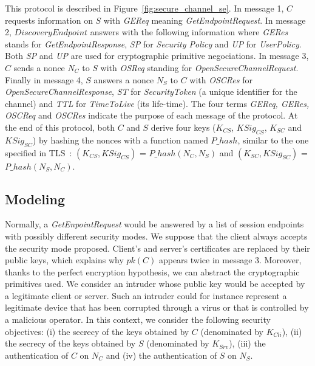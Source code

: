 This protocol is described in Figure~\ref{fig:secure_channel_se}.  In
message 1, $C$ requests information on $S$ with {\em GEReq} meaning
{\em GetEndpointRequest}.  In message 2, $DiscoveryEndpoint$ answers
with the following  information where {\em GERes} stands for {\em
  GetEndpointResponse}, {\em SP} for {\em Security Policy} and {\em
  UP} for {\em UserPolicy}.  Both {\em SP} and {\em UP} are used for
cryptographic primitive negociations.  In message 3, $C$ sends a nonce
 $N_{C}$ to $S$ with {\em OSReq} standing for {\em
  OpenSecureChannelRequest}.  Finally in message 4, $S$ answers a
nonce $N_{S}$ to $C$ with {\em OSCRes} for {\em
  OpenSecureChannelResponse}, {\em ST} for {\em SecurityToken} (a
unique identifier for the channel) and {\em TTL} for {\em TimeToLive}
(its life-time).  The four terms {\em GEReq, GERes, OSCReq} and {\em
  OSCRes} indicate the purpose of each message of the protocol.  At
  the end of this protocol, both $C$ and $S$ derive four keys ($K_{CS}$,
  $KSig_{CS}$, $K_{SC}$ and $KSig_{SC}$) by hashing the
nonces with a function named $P\_hash$, similar to the one specified
in TLS~\cite{DR08}: $(K_{CS}, KSig_{CS})$ = $P\_hash(N_{C}, N_{S})$
and $(K_{SC}, KSig_{SC})$ = $P\_hash(N_{S}, N_{C})$.

\subsection{Modeling}\label{sec:secure_channel_modeling}

Normally, a {\em GetEnpointRequest} would be answered by a list of
session endpoints with possibly different security modes. We suppose
that the client always accepts the security mode proposed.  Client's
and server's certificates are replaced by their public keys, which
explains why $pk(C)$ appears twice in message 3.  Moreover, thanks to
the perfect encryption hypothesis, we can abstract the cryptographic
primitives used.  We consider an intruder whose public key would be
accepted by a legitimate client or server.  Such an intruder could for
instance represent a legitimate device that has been corrupted through
a virus or that is controlled by a malicious operator.
In this context, we consider the following security objectives: (i)
the secrecy of the keys obtained by $C$ (denominated by $K_{Cli}$), (ii) the
secrecy of the keys obtained by $S$ (denominated by $K_{Srv}$), (iii) the
authentication of $C$ on $N_{C}$ and (iv) the authentication of $S$ on $N_{S}$.

